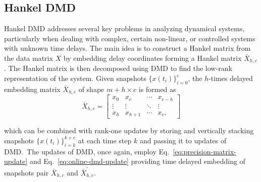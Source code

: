 \subsection{Hankel DMD}
Hankel DMD addresses several key problems in analyzing dynamical systems, particularly when dealing with complex, certain non-linear, or controlled systems with unknown time delays. The main idea is to construct a Hankel matrix from the data matrix \(X\) by embedding delay coordinates forming a Hankel matrix \(\bar{X}_{h, c}\). The Hankel matrix is then decomposed using DMD to find the low-rank representation of the system. Given snapshots \({\{x(t_i)\}}^c_{i=0}\), the \(h\)-times delayed embedding matrix \(\bar{X}_{h, c}\) of shape \(m + h \times c\) is formed as
\begin{equation}\label{eq:hankel}
	\bar{X}_{h, c} = \begin{bmatrix}
		x_0    & x_c       & \cdots & x_{c - h} \\
		\vdots & \vdots    & \ddots & \vdots    \\
		x_{h}  & x_{h + 1} & \cdots & x_{c},
	\end{bmatrix}
\end{equation}

which can be combined with rank-one updates by storing and vertically stacking snapshots \({\{x(t_i)\}}^{k+c}_{i=k}\) at each time step \(k\) and passing it to updates of DMD.~The updates of DMD, once again, employ Eq.~\eqref{eq:precision-matrix-update} and Eq.~\eqref{eq:online-dmd-update}  providing time delayed embedding of snapshots pair \(\bar{X}_{h, c}\) and \(\bar{X}^\prime_{h, c}\).
